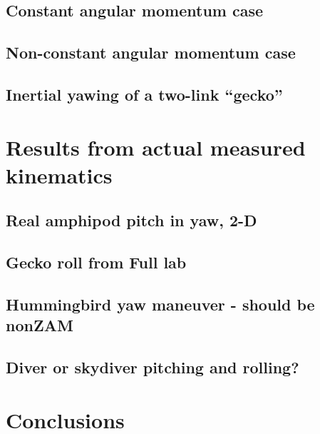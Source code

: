 \documentclass{amsart}
\begin{document}
\subsection{Constant angular momentum case}
\subsection{Non-constant angular momentum case}
\subsection{Inertial yawing of a two-link ``gecko''}


\section{Results from actual measured kinematics}
\label{sec:real}

\subsection{Real amphipod pitch in yaw, 2-D}
\subsection{Gecko roll from Full lab}
\subsection{Hummingbird yaw maneuver - should be nonZAM} 
\subsection{Diver or skydiver pitching and rolling?}


\section{Conclusions}



\end{document}

